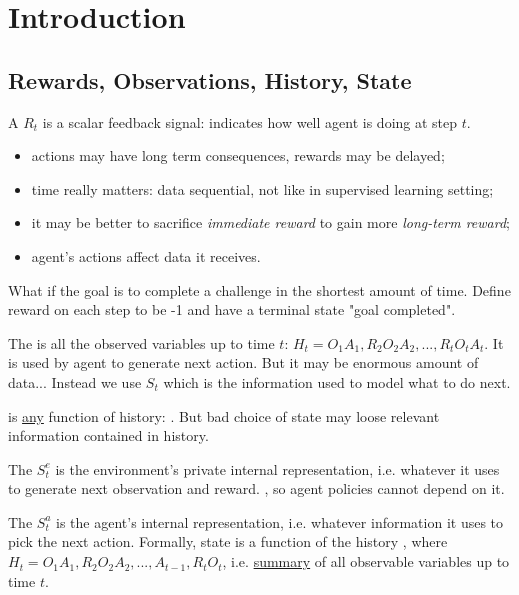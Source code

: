 \section{Introduction}

\subsection{Rewards, Observations, History, State}

A  $R_t$ is a scalar feedback signal: indicates how well agent is doing at step $t$. 
\begin{itemize}
	\item actions may have long term consequences, rewards may be delayed;
	\item time really matters: data sequential, not \iid like in supervised learning setting;
	\item it may be better to sacrifice \textit{immediate reward} to gain more \textit{long-term reward};
	\item agent's actions affect data it receives.
\end{itemize}

\begin{notebox}
	What if the goal is to complete a challenge in the shortest amount of time. Define reward on each step to be -1 and have a terminal state "goal completed".
\end{notebox}


The  is all the observed variables up to time $t$: $H_t = O_1 A_1, R_2 O_2 A_2, ..., R_t O_t A_t$. It is used by agent to generate next action. But it may be enormous amount of data... Instead we use  $S_t$ which is the information used to model what to do next. 

 is \underline{any} function of history: . But bad choice of state may loose relevant information contained in history.

The  $S^e_t$ is the environment's private internal representation, i.e. whatever it uses to generate next observation and reward. , so agent policies cannot depend on it.

The  $S^a_t$ is the agent's internal representation, i.e. whatever information it uses to pick the next action. Formally, state is a function of the history , where $H_t = O_1 A_1, R_2 O_2 A_2, ..., A_{t-1}, R_{t} O_{t}$, i.e. \underline{summary} of all observable variables up to time $t$. 

